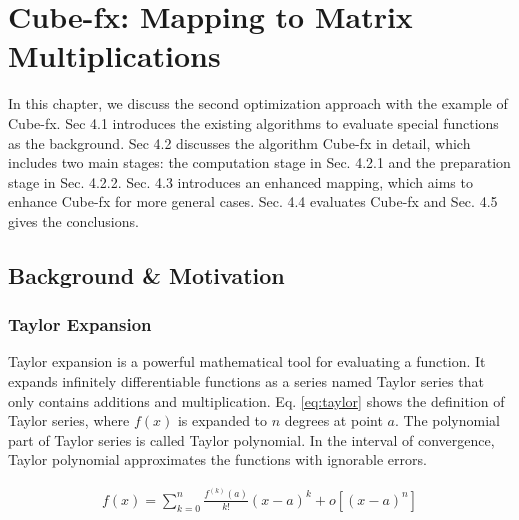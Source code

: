 \chapter{Cube-fx: Mapping to Matrix Multiplications}
\label{sec_4}

In this chapter, we discuss the second optimization approach with the example of Cube-fx. Sec 4.1 introduces the existing algorithms to evaluate special functions as the background. Sec 4.2 discusses the algorithm Cube-fx in detail, which includes two main stages: the computation stage in Sec. 4.2.1 and the preparation stage in Sec. 4.2.2. Sec. 4.3 introduces an enhanced mapping, which aims to enhance Cube-fx for more general cases. Sec. 4.4 evaluates Cube-fx and Sec. 4.5 gives the conclusions.

\section{Background \& Motivation}

\subsection{Taylor Expansion \label{sec:2.3}}

Taylor expansion is a powerful mathematical tool for evaluating a function. It expands infinitely differentiable functions as a series named Taylor series that only contains additions and multiplication. Eq. \ref{eq:taylor} shows the definition of Taylor series, where $f(x)$ is expanded to $n$ degrees at point $a$. The polynomial part of Taylor series is called Taylor polynomial. In the interval of convergence, Taylor polynomial approximates the functions with ignorable errors.

\begin{equation}
    \label{eq:taylor}
    \begin{aligned}
    f(x) = \sum_{k = 0}^{n}\frac{f^{(k)}(a)}{k!}(x - a)^k + o[(x - a) ^ n]
    \end{aligned}
    \end{equation}

